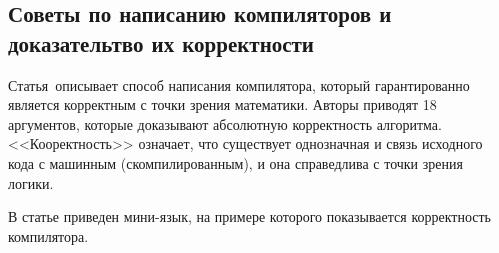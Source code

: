 \subsection{Советы по написанию компиляторов и доказательтво их корректности} \label{subsection_Thatcher1981}
Статья\,\cite{Thatcher1981} описывает способ написания компилятора, который гарантированно является корректным с точки зрения математики. Авторы приводят 18 аргументов, которые доказывают абсолютную корректность алгоритма. <<Кооректность>> означает, что существует однозначная и связь исходного кода с машинным (скомпилированным), и она справедлива с точки зрения логики. 

В статье приведен мини-язык, на примере которого показывается корректность компилятора.

